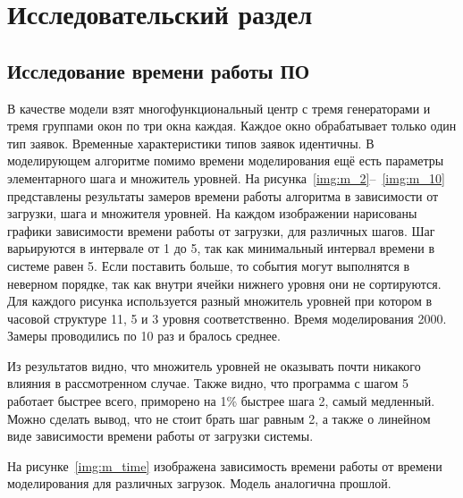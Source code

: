 \chapter{Исследовательский раздел}
	
\section{Исследование времени работы ПО}

В качестве модели взят многофункциональный центр с тремя генераторами и тремя группами окон по три окна каждая. Каждое окно обрабатывает только один тип заявок. Временные характеристики типов заявок идентичны. В моделирующем алгоритме помимо времени моделирования ещё есть параметры элементарного шага и множитель уровней.
На рисунка~\ref{img:m_2}--~\ref{img:m_10} представлены результаты замеров времени работы алгоритма в зависимости от загрузки, шага и множителя уровней. На каждом изображении нарисованы графики зависимости времени работы от загрузки, для различных шагов. Шаг варьируются в интервале от 1 до 5, так как минимальный интервал времени в системе равен 5. Если поставить больше, то события могут выполнятся в неверном порядке, так как внутри ячейки нижнего уровня они не сортируются. Для каждого рисунка используется разный множитель уровней при котором в часовой структуре 11, 5 и 3 уровня соответственно. Время моделирования 2000. Замеры проводились по 10 раз и бралось среднее.

\FloatBarrier

\FloatBarrier

\FloatBarrier

Из результатов видно, что множитель уровней не оказывать почти никакого влияния в рассмотренном случае. Также видно, что программа с шагом 5 работает быстрее всего, приморено на 1\% быстрее шага 2, самый медленный. Можно сделать вывод, что не стоит брать шаг равным 2, а также о линейном виде зависимости времени работы от загрузки системы.

На рисунке~\ref{img:m_time} изображена зависимость времени работы от времени моделирования для различных загрузок. Модель аналогична прошлой.  

\FloatBarrier

